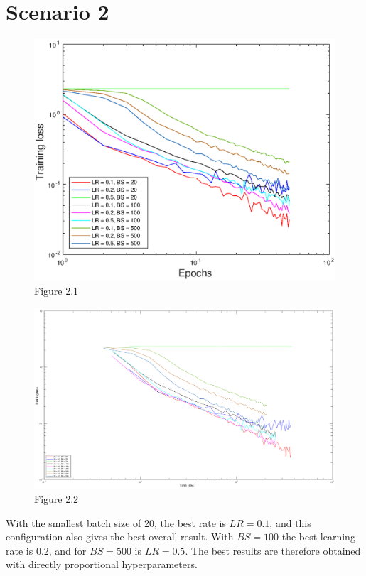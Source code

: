 \documentclass{article}
\begin{document}
\section*{Scenario 2}
	\begin{figure}[!htb]
        \centering
        \includegraphics[width=\textwidth]{figures/sc2_tr_loss}
        \captionsetup{labelformat=empty}
        \caption{Figure 2.1}
    \end{figure}
    \begin{figure}[!htb]
        \centering
        \includegraphics[width=\textwidth]{figures/sc2_tr_loss_time}
        \captionsetup{labelformat=empty}
        \caption{Figure 2.2}
    \end{figure}

    With the smallest batch size of 20, the best rate is $LR = 0.1$, and this configuration also gives the best overall result. With $BS = 100$ the best learning rate is 0.2, and for $BS = 500$ is $LR = 0.5$.
    The best results are therefore obtained with directly proportional hyperparameters.
    
\end{document}
